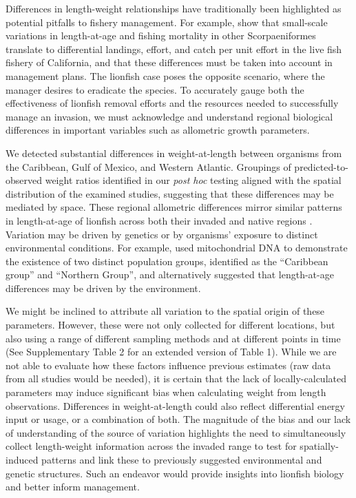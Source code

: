 \documentclass[fleqn,10pt,lineno]{wlpeerj} %
\begin{document}
Differences in length-weight relationships have traditionally been
highlighted as potential pitfalls to fishery management. For example,
\citet{wilson_2012} show that small-scale variations in length-at-age
and fishing mortality in other Scorpaeniformes translate to differential
landings, effort, and catch per unit effort in the live fish fishery of
California, and that these differences must be taken into account in
management plans. The lionfish case poses the opposite scenario, where
the manager desires to eradicate the species. To accurately gauge both
the effectiveness of lionfish removal efforts and the resources needed
to successfully manage an invasion, we must acknowledge and understand
regional biological differences in important variables such as
allometric growth parameters.

We detected substantial differences in weight-at-length between
organisms from the Caribbean, Gulf of Mexico, and Western Atlantic.
Groupings of predicted-to-observed weight ratios identified in our
\emph{post hoc} testing aligned with the spatial distribution of the
examined studies, suggesting that these differences may be mediated by
space. These regional allometric differences mirror similar patterns in
length-at-age of lionfish across both their invaded and native regions
\citep{pusack_2016}. Variation may be driven by genetics or by
organisms' exposure to distinct environmental conditions. For example,
\citet{betancurr_2011} used mitochondrial DNA to demonstrate the
existence of two distinct population groups, identified as the
``Caribbean group'' and ``Northern Group'', and \citet{fogg_2015}
alternatively suggested that length-at-age differences may be driven by
the environment.

We might be inclined to attribute all variation to the spatial origin of
these parameters. However, these were not only collected for different
locations, but also using a range of different sampling methods and at
different points in time (See Supplementary Table 2 for an extended
version of Table 1). While we are not able to evaluate how these factors
influence previous estimates (raw data from all studies would be
needed), it is certain that the lack of locally-calculated parameters
may induce significant bias when calculating weight from length
observations. Differences in weight-at-length could also reflect
differential energy input or usage, or a combination of both. The
magnitude of the bias and our lack of understanding of the source of
variation highlights the need to simultaneously collect length-weight
information across the invaded range to test for spatially-induced
patterns and link these to previously suggested environmental and
genetic structures. Such an endeavor would provide insights into
lionfish biology and better inform management.
\end{document}

